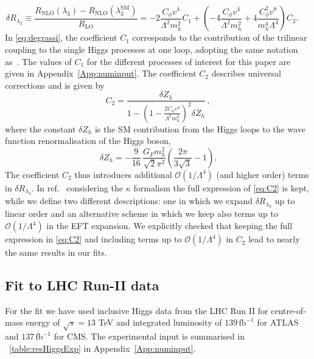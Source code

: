 \begin{equation}
	\delta R_{\lambda_3}\equiv\frac{R_\mathrm{ NLO}(\lambda_3)-R_\mathrm{ NLO}(\lambda_3^\mathrm{{SM}})}{R_\mathrm{ LO}}=-2\frac{C_{\phi}v^4}{\Lambda^2 m_h^2}C_1 + \left(-4\frac{C_{\phi}v^4}{\Lambda^2 m_h^2}+4\frac{C_{\phi}^2 v^8}{m_h^4\Lambda^4}\right) C_2 . \;\;\;\;\;
	\label{eq:degrassi}
\end{equation}
%
In \eqref{eq:degrassi}, the coefficient $C_1$ corresponds to the contribution of the trilinear coupling to the single Higgs processes at one loop, adopting the same notation as~\cite{Degrassi:2016wml}. The values of $C_1$ for the different processes of interest for this paper are given in Appendix~\autoref{App:numinput}. The coefficient $C_2$ describes universal corrections and is given by
\begin{equation}
	C_2=\frac{\delta Z_h}{1-\left(1-\frac{2 C_\phi v^4}{\Lambda^2 m_h^2}\right)^2 \delta Z_h}\,, \label{eq:C2}
\end{equation}
%
where the constant $\delta Z_h$ is the SM contribution from the Higgs loops to the wave function renormalisation of the Higgs boson,
\begin{equation}
	\delta Z_h =-\frac{9}{16}\,\frac{G_F m_h^2}{\sqrt{2}\pi^2}\left(\frac{2\pi}{3\sqrt{3}}-1\right).
\end{equation}
%
The coefficient $C_2$ thus introduces additional $\mathcal{O}(1/\Lambda^4)$ (and higher order) terms in $\delta R_{\lambda_3}$.  
In ref.~\cite{Degrassi:2016wml} considering the $\kappa$ formalism the full expression of \eqref{eq:C2} is kept, while we define two different descriptions: one in which we expand $\delta R_{\lambda_3}$ up to linear order and an alternative scheme in which we keep also terms up to $\mathcal{O}(1/\Lambda^4)$ in the EFT expansion. We explicitly checked that keeping the full expression in \eqref{eq:C2} and including terms up to $\mathcal{O}(1/\Lambda^4)$  in $C_2$ lead to nearly the same results in our fits.


\subsection{Fit to LHC Run-II data}

\par 
For the fit we have used inclusive Higgs data from the LHC Run II for centre-of-mass energy of $\sqrt{s} = 13$ TeV and  integrated luminosity of $ 139\, \mathrm{fb}^{-1}$ for ATLAS and  $ 137\,\mathrm{fb}^{-1}$ for CMS.  The experimental input is summarised in ~\autoref{table:resHiggsExp} in Appendix~\ref{App:numinput}.  

